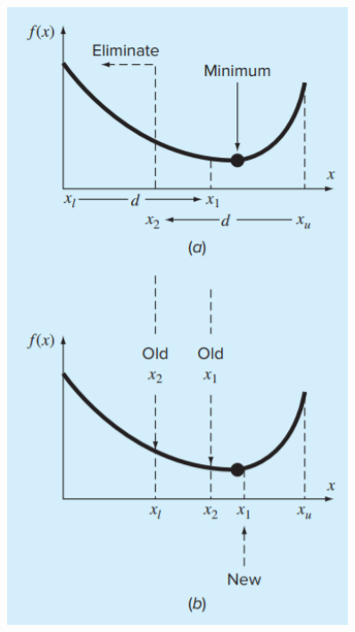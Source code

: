 \documentclass{if-beamer}
\begin{document}
\begin{frame}[t]
\begin{minipage}{0.4\textwidth}
\begin{figure}
				\includegraphics[width = 0.9\textwidth]{figures/method}
			\end{figure}
		\end{minipage}
\end{frame}
\end{document}
